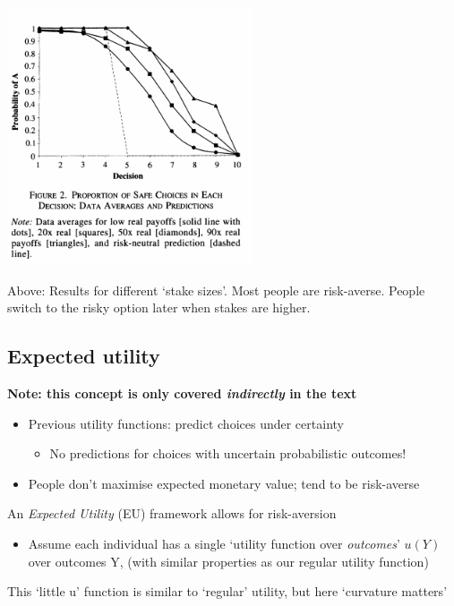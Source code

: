 \documentclass[]{article}
\providecommand{\tightlist}{%
  \setlength{\itemsep}{0pt}\setlength{\parskip}{0pt}}
\begin{document}
\includegraphics[height=3in]{picsfigs/holtlauryresults.png}

Above: Results for different `stake sizes'. Most people are risk-averse.
People switch to the risky option later when stakes are higher.

\hypertarget{expected-utility}{%
\subsection{Expected utility}\label{expected-utility}}

\textbf{Note: this concept is only covered \emph{indirectly} in the
text}

\begin{itemize}
\tightlist
\item
  Previous utility functions: predict choices under certainty

  \begin{itemize}
  \tightlist
  \item
    No predictions for choices with uncertain probabilistic outcomes!
  \end{itemize}
\item
  People don't maximise expected monetary value; tend to be risk-averse
\end{itemize}

An \emph{Expected Utility} (EU) framework allows for risk-aversion

\begin{itemize}
\tightlist
\item
  Assume each individual has a single `utility function over
  \emph{outcomes}' \(u(Y)\) over outcomes Y, (with similar properties as
  our regular utility function)
\end{itemize}

This `little u' function is similar to `regular' utility, but here
`curvature matters'
\end{document}
